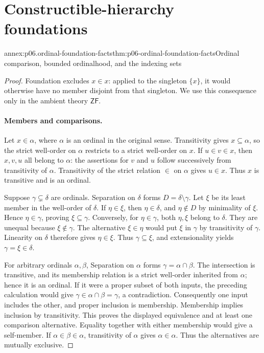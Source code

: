 \section{Constructible-hierarchy foundations}

\begin{annexitem}{annex:p06.ordinal-foundation-facts}{thm:p06-ordinal-foundation-facts}{Ordinal comparison, bounded ordinalhood, and the indexing sets}
\begin{proof}
Foundation excludes \(x\in x\): applied to the singleton \(\{x\}\),
it would otherwise have no member disjoint from that singleton.
We use this consequence only in the ambient theory \(\mathsf{ZF}\).

\paragraph{Members and comparisons.}
Let \(x\in\alpha\), where \(\alpha\) is an ordinal in the original
sense.  Transitivity gives \(x\subseteq\alpha\), so the strict
well-order on \(\alpha\) restricts to a strict well-order on \(x\).
If \(u\in v\in x\), then \(x,v,u\) all belong to \(\alpha\):
the assertions for \(v\) and \(u\) follow successively from
transitivity of \(\alpha\).  Transitivity of the strict relation
\(\in\) on \(\alpha\) gives \(u\in x\).  Thus \(x\) is transitive
and is an ordinal.

Suppose \(\gamma\subsetneq\delta\) are ordinals.  Separation on
\(\delta\) forms \(D=\delta\setminus\gamma\).  Let \(\xi\) be its
least member in the well-order of \(\delta\).  If \(\eta\in\xi\),
then \(\eta\in\delta\), and \(\eta\notin D\) by minimality of
\(\xi\).  Hence \(\eta\in\gamma\), proving
\(\xi\subseteq\gamma\).  Conversely, for \(\eta\in\gamma\), both
\(\eta,\xi\) belong to \(\delta\).  They are unequal because
\(\xi\notin\gamma\).  The alternative \(\xi\in\eta\) would put
\(\xi\) in \(\gamma\) by transitivity of \(\gamma\).
Linearity on \(\delta\) therefore gives \(\eta\in\xi\).
Thus \(\gamma\subseteq\xi\), and extensionality yields
\(\gamma=\xi\in\delta\).

For arbitrary ordinals \(\alpha,\beta\), Separation on \(\alpha\)
forms \(\gamma=\alpha\cap\beta\).  The intersection is transitive,
and its membership relation is a strict well-order inherited from
\(\alpha\); hence it is an ordinal.  If it were a proper subset
of both inputs, the preceding calculation would give
\(\gamma\in\alpha\cap\beta=\gamma\), a contradiction.  Consequently
one input includes the other, and proper inclusion is membership.
Membership implies inclusion by transitivity.  This proves the
displayed equivalence and at least one comparison alternative.
Equality together with either membership would give a self-member.
If \(\alpha\in\beta\in\alpha\), transitivity of \(\alpha\) gives
\(\alpha\in\alpha\).  Thus the alternatives are mutually exclusive.


\end{proof}
\end{annexitem}
